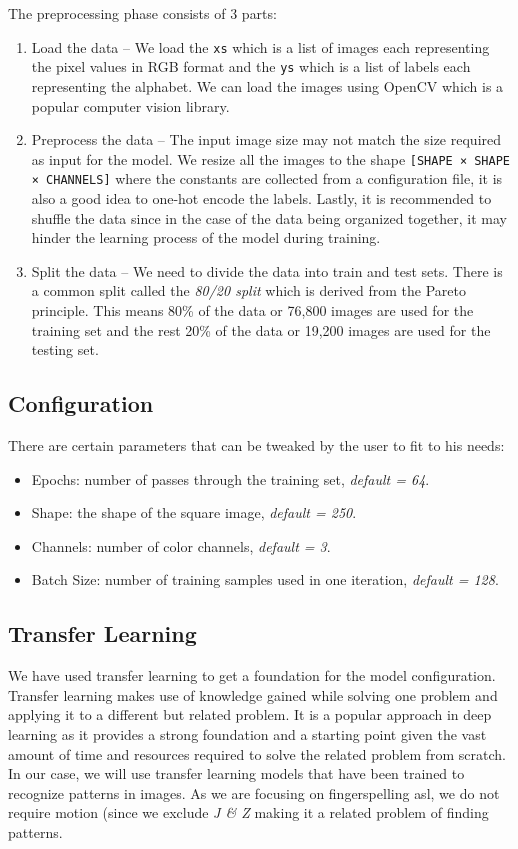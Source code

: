 \documentclass[twocolumn]{article}
\begin{document}
The preprocessing phase consists of 3 parts:
\begin{enumerate}
	\item Load the data – We load the \texttt{xs} which is a list of images each 
	representing the pixel values in RGB format and the \texttt{ys} which is a 
	list of labels each representing the alphabet. We can load the images using 
	OpenCV which is a popular computer vision library.
	\item Preprocess the data – The input image size may not match the size 
	required as input for the model. We resize all the images to the shape 
	\texttt{[SHAPE × SHAPE × CHANNELS]} where the constants are collected from a 
	configuration file, it is also a good idea to one-hot encode the labels. 
	Lastly, it is recommended to shuffle the data since in the case of the data 
	being organized together, it may hinder the learning process of the model 
	during training.
	\item Split the data – We need to divide the data into train and test sets. 
	There is a common split called the \textit{80/20 split} which is derived 
	from the Pareto principle. This means 80\% of the data or 76,800 images are 
	used for the training set and the rest 20\% of the data or 19,200 images are 
	used for the testing set.
\end{enumerate}

\subsection{Configuration}

There are certain parameters that can be tweaked by the user to fit to his needs:
\begin{itemize}
	\item Epochs: number of passes through the training set, \textit{default = 64}.
	\item Shape: the shape of the square image, \textit{default = 250}.
	\item Channels: number of color channels, \textit{default = 3}.
	\item Batch Size: number of training samples used in one iteration, \textit{default = 128}.
\end{itemize}

\subsection{Transfer Learning}

We have used transfer learning to get a foundation for the model 
configuration. Transfer learning makes use of knowledge gained while solving 
one problem and applying it to a different but related problem. It is a 
popular approach in deep learning as it provides a strong foundation and a 
starting point given the vast amount of time and resources required to solve 
the related problem from scratch. In our case, we will use transfer learning 
models that have been trained to recognize patterns in images. As we are 
focusing on fingerspelling \gls{asl}, we do not require motion (since we 
exclude \textit{J \& Z} making it a related problem of finding patterns.
\end{document}

